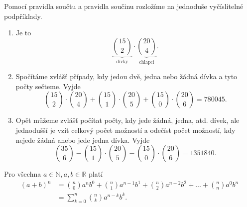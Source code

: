 \begin{reseni}
Pomocí pravidla součtu a pravidla součinu rozložíme na jednoduše vyčíslitelné podpříklady.
\begin{enumerate}[$a.$]
\item Je to
$$\underbrace{\binom{15}{2}}_{\textrm{dívky}} \cdot \underbrace{\binom{20}{4}}_{\textrm{chlapci}}.$$
\item Spočítáme zvlášť případy, kdy jedou dvě, jedna nebo žádná dívka a tyto počty sečteme.
Vyjde
$$
\binom{15}{2} \cdot \binom{20}{4} + \binom{15}{1} \cdot \binom{20}{5} + \binom{15}{0} \cdot \binom{20}{6}=  780045.
$$
\item Opět můžeme zvlášť počítat počty, kdy jede žádná, jedna, atd. dívek, ale jednodušší
je vzít celkový počet možností a odečíst počet možností, kdy nejede žádná anebo jede
jedna dívka. Vyjde
$$
    \binom{35}{6} - \binom{15}{1} \cdot \binom{20}{5} - \binom{15}{0} \cdot \binom{20}{6} =1351840.
$$
\end{enumerate}
\end{reseni}

\begin{veta}\label{binom_v}
    Pro všechna $a \in \mathbb N, a,b \in \mathbb R$ platí
    \begin{align*}
        (a+b)^n & = \binom{n}{0}a^nb^0 + \binom{n}{1}a^{n-1}b^1 + \binom{n}{2}
        a^{n-2}b^2 + \dots + \binom{n}{n}a^0b^n \\
        &= \sum_{k=0}^n \binom{n}{k}a^{n-k}b^k.
    \end{align*}
\end{veta}

